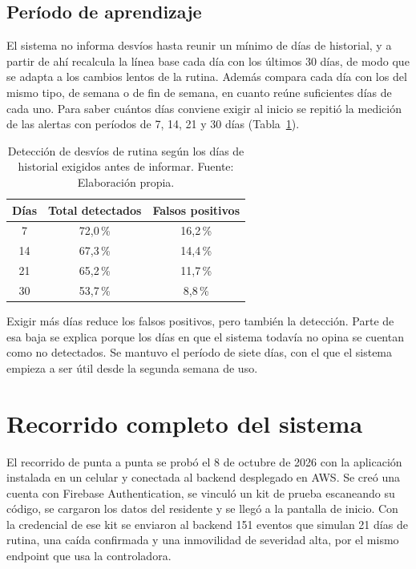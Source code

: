\subsection{Período de aprendizaje}
\label{sec:pruebas_aprendizaje}

El sistema no informa desvíos hasta reunir un mínimo de días de historial, y a partir de ahí recalcula la línea base cada día con los últimos 30 días, de modo que se adapta a los cambios lentos de la rutina.
Además compara cada día con los del mismo tipo, de semana o de fin de semana, en cuanto reúne suficientes días de cada uno.
Para saber cuántos días conviene exigir al inicio se repitió la medición de las alertas con períodos de 7, 14, 21 y 30 días (Tabla~\ref{tab:baseline_dias}).

\begin{table}[H]
\centering
\caption[Detección de desvíos según los días de historial exigidos.]{Detección de desvíos de rutina según los días de historial exigidos antes de informar. Fuente: Elaboración propia.}
\label{tab:baseline_dias}
\small
\begin{tabular}{@{}ccc@{}}
\toprule
\textbf{Días} & \textbf{Total detectados} & \textbf{Falsos positivos} \\
\midrule
7 & 72,0\,\% & 16,2\,\% \\
14 & 67,3\,\% & 14,4\,\% \\
21 & 65,2\,\% & 11,7\,\% \\
30 & 53,7\,\% & 8,8\,\% \\
\bottomrule
\end{tabular}
\end{table}

Exigir más días reduce los falsos positivos, pero también la detección.
Parte de esa baja se explica porque los días en que el sistema todavía no opina se cuentan como no detectados.
Se mantuvo el período de siete días, con el que el sistema empieza a ser útil desde la segunda semana de uso.

\section{Recorrido completo del sistema}
\label{sec:pruebas_integracion}

El recorrido de punta a punta se probó el 8 de octubre de 2026 con la aplicación instalada en un celular y conectada al backend desplegado en AWS.
Se creó una cuenta con Firebase Authentication, se vinculó un kit de prueba escaneando su código, se cargaron los datos del residente y se llegó a la pantalla de inicio.
Con la credencial de ese kit se enviaron al backend 151 eventos que simulan 21 días de rutina, una caída confirmada y una inmovilidad de severidad alta, por el mismo endpoint que usa la controladora.

